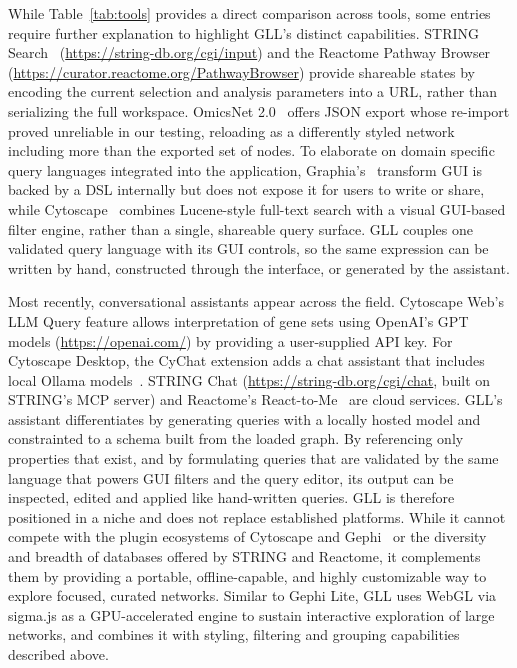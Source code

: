 While Table~\ref{tab:tools} provides a direct comparison across tools, some entries require further explanation to highlight GLL's distinct capabilities. STRING Search~\citep{szklarczykSTRINGDatabase20252025} (\url{https://string-db.org/cgi/input}) and the Reactome Pathway Browser~\citep{ragueneauReactomeKnowledgebase20262026} (\url{https://curator.reactome.org/PathwayBrowser}) provide shareable states by encoding the current selection and analysis parameters into a URL, rather than serializing the full workspace. OmicsNet 2.0~\citep{zhouOmicsNet20Webbased2022} offers JSON export whose re-import proved unreliable in our testing, reloading as a differently styled network including more than the exported set of nodes. To elaborate on domain specific query languages integrated into the application, Graphia's~\citep{freemanGraphiaPlatformGraphbased2022} transform GUI is backed by a DSL internally but does not expose it for users to write or share, while Cytoscape~\citep{shannonCytoscapeSoftwareEnvironment2003} combines Lucene-style full-text search with a visual GUI-based filter engine, rather than a single, shareable query surface. GLL couples one validated query language with its GUI controls, so the same expression can be written by hand, constructed through the interface, or generated by the assistant.

Most recently, conversational assistants appear across the field. Cytoscape Web's LLM Query feature allows interpretation of gene sets using OpenAI's GPT models (\url{https://openai.com/}) by providing a user-supplied API key. For Cytoscape Desktop, the CyChat extension adds a chat assistant that includes local Ollama models~\citep{lieboldCyChatConversationalCytoscape2026}. STRING Chat (\url{https://string-db.org/cgi/chat}, built on STRING's MCP server) and Reactome's React-to-Me~\citep{ragueneauReactomeKnowledgebase20262026} are cloud services. GLL's assistant differentiates by generating queries with a locally hosted model and constrainted to a schema built from the loaded graph. By referencing only properties that exist, and by formulating queries that are validated by the same language that powers GUI filters and the query editor, its output can be inspected, edited and applied like hand-written queries. GLL is therefore positioned in a niche and does not replace established platforms. While it cannot compete with the plugin ecosystems of Cytoscape and Gephi~\citep{bastianGephiOpenSource2009} or the diversity and breadth of databases offered by STRING and Reactome, it complements them by providing a portable, offline-capable, and highly customizable way to explore focused, curated networks. Similar to Gephi Lite, GLL uses WebGL via sigma.js as a GPU-accelerated engine to sustain interactive exploration of large networks, and combines it with styling, filtering and grouping capabilities described above.

